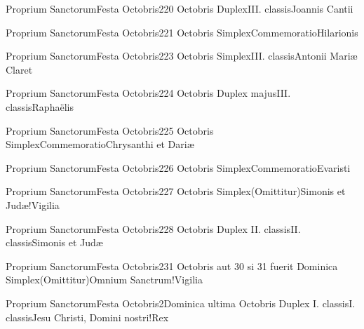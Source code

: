 \documentclass[liber-responsorialis_aestivus.tex]{subfiles}
\begin{document}
	{Proprium Sanctorum}{Festa Octobris}{2}{20 Octobris}
	{Duplex}{III. classis}{Joannis Cantii}
	{\conprubric}
	{\respdetemp}

	{Proprium Sanctorum}{Festa Octobris}{2}{21 Octobris}
	{Simplex}{Commemoratio}{Hilarionis}
	{\conprubric}
	{\respdetemp}

	{Proprium Sanctorum}{Festa Octobris}{2}{23 Octobris}
	{Simplex}{III. classis}{Antonii Mariæ Claret}
	{}
	{}
\rubric{\respdetemp}

	{Proprium Sanctorum}{Festa Octobris}{2}{24 Octobris}
	{Duplex majus}{III. classis}{Raphaëlis}
	{}
	{}

	{Proprium Sanctorum}{Festa Octobris}{2}{25 Octobris}
	{Simplex}{Commemoratio}{Chrysanthi et Dariæ}
	{}
	{}
\rubric{\respdetemp}

	{Proprium Sanctorum}{Festa Octobris}{2}{26 Octobris}
	{Simplex}{Commemoratio}{Evaristi}
	{}
	{}
\rubric{\respdetemp}

	{Proprium Sanctorum}{Festa Octobris}{2}{27 Octobris}
	{Simplex}{(Omittitur)}{Simonis et Judæ!Vigilia}
	{}
	{}
\rubric{\respdetemp}

	{Proprium Sanctorum}{Festa Octobris}{2}{28 Octobris}
	{Duplex II. classis}{II. classis}{Simonis et Judæ}
	{}
	{}
\rubric{\apexrubric}

	{Proprium Sanctorum}{Festa Octobris}{2}{31 Octobris aut 30 si 31 fuerit Dominica}
	{Simplex}{(Omittitur)}{Omnium Sanctrum!Vigilia}
	{}
	{}
\rubric{\respdetemp}

	{Proprium Sanctorum}{Festa Octobris}{2}{Dominica ultima Octobris}
	{Duplex I. classis}{I. classis}{Jesu Christi, Domini nostri!Rex}
	{}
	{}
\end{document}
